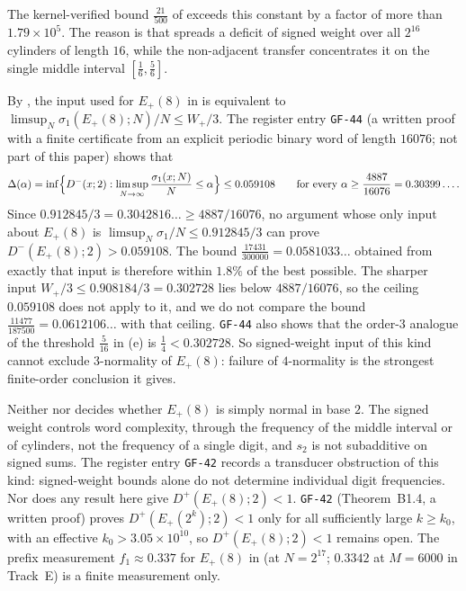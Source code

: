 \documentclass[11pt]{article}
\newcommand{\ttbreak}{\discretionary{}{}{}}
\newcommand{\ttt}[1]{\texttt{\begingroup\def\_{\textunderscore\ttbreak}#1\endgroup}}
\begin{document}
The kernel-verified bound $\frac{21}{500}$ of  exceeds this constant by a factor of more than $1.79\times10^5$. The reason is that  spreads a deficit of signed weight over all $2^{16}$ cylinders of length $16$, while the non-adjacent transfer concentrates it on the single middle interval $[\frac16,\frac56]$.

\begin{remark}\label{rem:ceiling}
By , the input used for $E_+(8)$ in  is equivalent to $\limsup_N\sigma_1(E_+(8);N)/N\le W_+/3$. The register entry \ttt{GF-44} (a written proof with a finite certificate from an explicit periodic binary word of length $16076$; not part of this paper) shows that
\[
\Delta(\alpha)=\inf\Bigl\{D^-(x;2):\limsup_{N\to\infty}\frac{\sigma_1(x;N)}N\le\alpha\Bigr\}\le0.059108\qquad\text{for every }\alpha\ge\frac{4887}{16076}=0.30399\ldots.
\]
Since $0.912845/3=0.3042816\ldots\ge4887/16076$, no argument whose only input about $E_+(8)$ is $\limsup_N\sigma_1/N\le0.912845/3$ can prove $D^-(E_+(8);2)>0.059108$. The bound $\frac{17431}{300000}=0.0581033\ldots$ obtained from exactly that input is therefore within $1.8\%$ of the best possible. The sharper input $W_+/3\le0.908184/3=0.302728$ lies below $4887/16076$, so the ceiling $0.059108$ does not apply to it, and we do not compare the bound $\frac{11477}{187500}=0.0612106\ldots$ with that ceiling. \ttt{GF-44} also shows that the order-$3$ analogue of the threshold $\frac5{16}$ in (e) is $\frac14<0.302728$. So signed-weight input of this kind cannot exclude $3$-normality of $E_+(8)$: failure of $4$-normality is the strongest finite-order conclusion it gives.
\end{remark}

\begin{remark}\label{rem:Eplus-open}
Neither  nor  decides whether $E_+(8)$ is simply normal in base $2$. The signed weight controls word complexity, through the frequency of the middle interval or of cylinders, not the frequency of a single digit, and $s_2$ is not subadditive on signed sums. The register entry \ttt{GF-42} records a transducer obstruction of this kind: signed-weight bounds alone do not determine individual digit frequencies. Nor does any result here give $D^+(E_+(8);2)<1$. \ttt{GF-42} (Theorem~B1.4, a written proof) proves $D^+(E_+(2^k);2)<1$ only for all sufficiently large $k\ge k_0$, with an effective $k_0>3.05\times10^{10}$, so $D^+(E_+(8);2)<1$ remains open. The prefix measurement $f_1\approx0.337$ for $E_+(8)$ in  (at $N=2^{17}$; $0.3342$ at $M=6000$ in Track~E) is a finite measurement only.
\end{remark}
\end{document}
